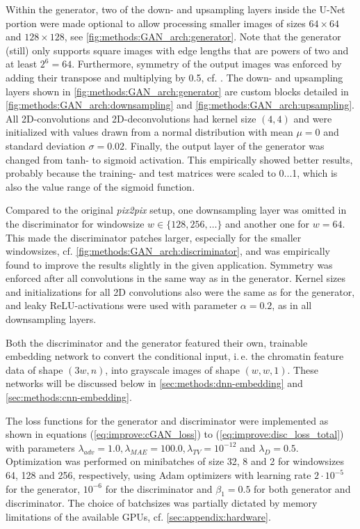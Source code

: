 Within the generator, two of the down- and upsampling layers inside the U-Net portion were made optional 
to allow processing smaller images of sizes $64\times64$ and $128\times128$, see \cref{fig:methods:GAN_arch:generator}.
Note that the generator (still) only supports square images with edge lengths that are powers of two and at least $2^6=64$.
Furthermore, symmetry of the output images was enforced by adding their transpose and multiplying by 0.5, cf. \cite{Fudenberg2020}.
The down- and upsampling layers shown in  \cref{fig:methods:GAN_arch:generator} are custom blocks 
detailed in \cref{fig:methods:GAN_arch:downsampling} and \ref{fig:methods:GAN_arch:upsampling}. 
All 2D-convolutions and 2D-deconvolutions had kernel size $(4,4)$ and were initialized with values drawn from a normal distribution with mean $\mu=0$ and
standard deviation $\sigma=0.02$.
Finally, the output layer of the generator was changed from tanh- to sigmoid activation.
This empirically showed better results, probably because the training- and test matrices were scaled to 0...1, which 
is also the value range of the sigmoid function.

Compared to the original \emph{pix2pix} setup, 
one downsampling layer was omitted in the discriminator for windowsize $w\in\{128,256,\dots\}$ and another one for $w=64$.
This made the discriminator patches larger, especially for the smaller windowsizes,
cf. \cref{fig:methods:GAN_arch:discriminator}, and was empirically found to improve the results
slightly in the given application.
Symmetry was enforced after all convolutions in the same way as in the generator.
Kernel sizes and initializations for all 2D convolutions also were the same as for the generator,
and leaky ReLU-activations were used with parameter $\alpha=0.2$, as in all downsampling layers.

Both the discriminator and the generator featured their own, trainable embedding network
to convert the conditional input, i.\,e. the chromatin feature data of shape $(3w, n)$,
into grayscale images of shape $(w,w,1)$. 
These networks will be discussed below in \cref{sec:methods:dnn-embedding}
and \cref{sec:methods:cnn-embedding}.

The loss functions for the generator and discriminator were implemented as shown in equations (\ref{eq:improve:cGAN_loss}) to (\ref{eq:improve:disc_loss_total})
with parameters $\lambda_\mathit{adv}=1.0, \lambda_\mathit{MAE}=100.0, \lambda_\mathit{TV}=10^{-12}$ and $\lambda_D=0.5$.
Optimization was performed on minibatches of size 32, 8 and 2 for windowsizes 64, 128 and 256, respectively, 
using Adam optimizers with learning rate $2\cdot10^{-5}$ for the generator, $10^{-6}$ for the discriminator and $\beta_1=0.5$ for both generator and discriminator.
The choice of batchsizes was partially dictated by memory limitations of the available GPUs, cf. \cref{sec:appendix:hardware}.

